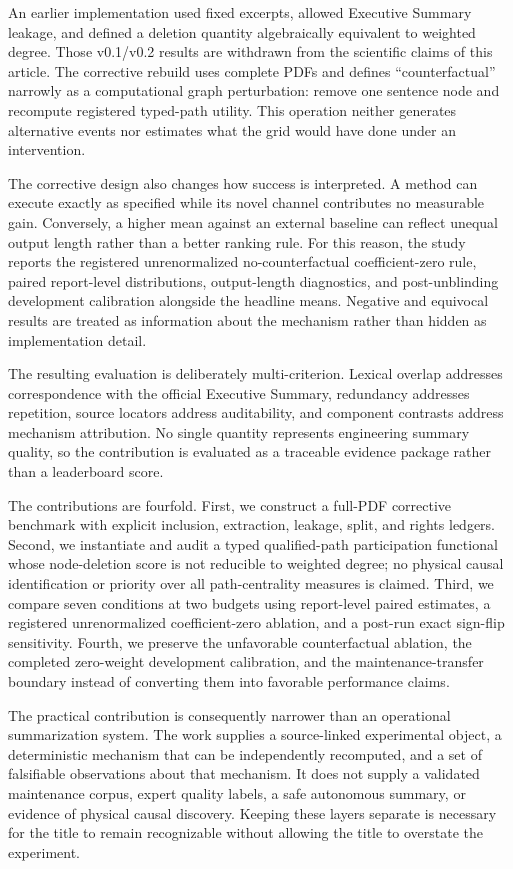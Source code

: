 \documentclass[applsci,article,submit,moreauthors]{Definitions/mdpi}
\begin{document}
An earlier implementation used fixed excerpts, allowed Executive Summary leakage, and defined a deletion quantity algebraically equivalent to weighted degree. Those v0.1/v0.2 results are withdrawn from the scientific claims of this article. The corrective rebuild uses complete PDFs and defines ``counterfactual'' narrowly as a computational graph perturbation: remove one sentence node and recompute registered typed-path utility. This operation neither generates alternative events nor estimates what the grid would have done under an intervention.

The corrective design also changes how success is interpreted. A method can execute exactly as specified while its novel channel contributes no measurable gain. Conversely, a higher mean against an external baseline can reflect unequal output length rather than a better ranking rule. For this reason, the study reports the registered unrenormalized no-counterfactual coefficient-zero rule, paired report-level distributions, output-length diagnostics, and post-unblinding development calibration alongside the headline means. Negative and equivocal results are treated as information about the mechanism rather than hidden as implementation detail.

The resulting evaluation is deliberately multi-criterion. Lexical overlap addresses correspondence with the official Executive Summary, redundancy addresses repetition, source locators address auditability, and component contrasts address mechanism attribution. No single quantity represents engineering summary quality, so the contribution is evaluated as a traceable evidence package rather than a leaderboard score.

The contributions are fourfold. First, we construct a full-PDF corrective benchmark with explicit inclusion, extraction, leakage, split, and rights ledgers. Second, we instantiate and audit a typed qualified-path participation functional whose node-deletion score is not reducible to weighted degree; no physical causal identification or priority over all path-centrality measures is claimed. Third, we compare seven conditions at two budgets using report-level paired estimates, a registered unrenormalized coefficient-zero ablation, and a post-run exact sign-flip sensitivity. Fourth, we preserve the unfavorable counterfactual ablation, the completed zero-weight development calibration, and the maintenance-transfer boundary instead of converting them into favorable performance claims.

The practical contribution is consequently narrower than an operational summarization system. The work supplies a source-linked experimental object, a deterministic mechanism that can be independently recomputed, and a set of falsifiable observations about that mechanism. It does not supply a validated maintenance corpus, expert quality labels, a safe autonomous summary, or evidence of physical causal discovery. Keeping these layers separate is necessary for the title to remain recognizable without allowing the title to overstate the experiment.
\end{document}
